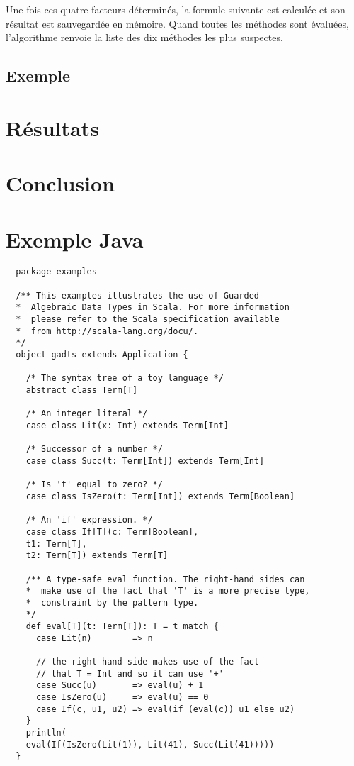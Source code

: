 \documentclass{article}
\begin{document}
Une fois ces quatre facteurs déterminés, la formule suivante est
calculée et son résultat est sauvegardée en
mémoire. Quand toutes les méthodes sont évaluées, l'algorithme renvoie
la liste des dix méthodes les plus suspectes.



\subsection{Exemple}

\section{Résultats}



\section{Conclusion}
\newpage
\section{Exemple Java}
\begin{lstlisting}
  package examples

  /** This examples illustrates the use of Guarded
  *  Algebraic Data Types in Scala. For more information
  *  please refer to the Scala specification available
  *  from http://scala-lang.org/docu/.
  */
  object gadts extends Application {

    /* The syntax tree of a toy language */
    abstract class Term[T]

    /* An integer literal */
    case class Lit(x: Int) extends Term[Int]

    /* Successor of a number */
    case class Succ(t: Term[Int]) extends Term[Int]

    /* Is 't' equal to zero? */
    case class IsZero(t: Term[Int]) extends Term[Boolean]

    /* An 'if' expression. */
    case class If[T](c: Term[Boolean],
    t1: Term[T],
    t2: Term[T]) extends Term[T]

    /** A type-safe eval function. The right-hand sides can
    *  make use of the fact that 'T' is a more precise type,
    *  constraint by the pattern type.
    */
    def eval[T](t: Term[T]): T = t match {
      case Lit(n)        => n

      // the right hand side makes use of the fact
      // that T = Int and so it can use '+'
      case Succ(u)       => eval(u) + 1
      case IsZero(u)     => eval(u) == 0
      case If(c, u1, u2) => eval(if (eval(c)) u1 else u2)
    }
    println(
    eval(If(IsZero(Lit(1)), Lit(41), Succ(Lit(41)))))
  }
\end{lstlisting}
\end{document}
